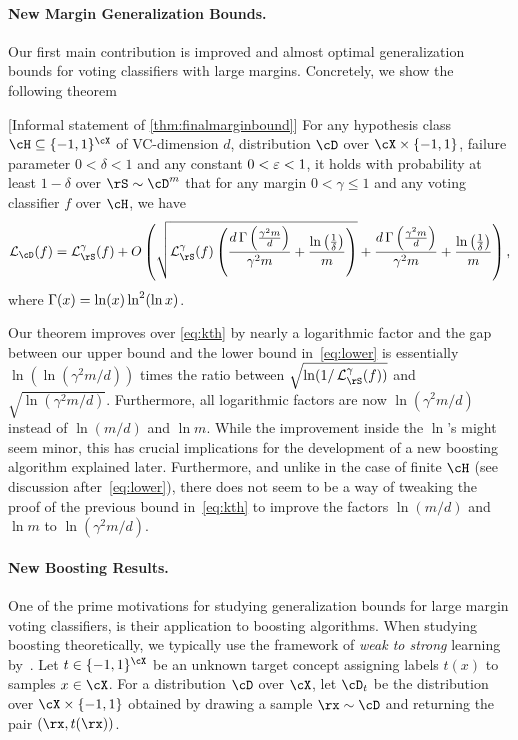 \paragraph{New Margin Generalization Bounds.}
Our first main contribution is improved and almost optimal generalization bounds for
voting classifiers with large margins. Concretely, we show the
following theorem
\begin{theorem}
\label{thm:mainintro}[Informal statement of \cref{thm:finalmarginbound}]
For any hypothesis class $ \cH \subseteq \{  -1,1\}^{\cX}$ of VC-dimension
$ d $, distribution $ \cD $ over $ \cX\times \{  -1,1\}  $, failure
parameter $0<\delta<1$ and any constant $ 0<\varepsilon<1 $, it holds with
probability at least $ 1-\delta $ over $ \rS\sim \cD^{m} $ that for
any margin $ 0<\gamma\leq 1 $ and any voting classifier $f$ over
$\cH$, we have
    \begin{align*}
     \ls_{\cD}(f)=  
     \ls_{\rS}^{\gamma}(f)
     +O\left(\sqrt{ \ls_{\rS}^{\gamma}(f) \left(\frac{d\func{\left(\frac{\gamma^{2}m }{d} \right)}}{\gamma^{2}m}
     +\frac{\ln{\left(\frac{1}{\delta} \right)}}{m}\right)}  + \frac{d\func{\left(\frac{\gamma^{2}m }{d} \right)}}{\gamma^{2}m}+\frac{\ln{\left(\frac{1}{\delta} \right)}}{m}\right),
    \end{align*}
where $\operatorname{\Gamma}(x) = \ln(x) \ln^2(\ln  x)$.
  \end{theorem}
Our theorem improves over \cref{eq:kth} by nearly a logarithmic
factor and the gap between our upper bound and the lower bound
in~\cref{eq:lower} is essentially $\ln(\ln(\gamma^2 m/d))$
times the ratio between $\sqrt{\ln(1/\ls^\gamma_\rS(f))}$ and
$\sqrt{\ln(\gamma^2 m/d)}$. Furthermore, all logarithmic factors are now $\ln(\gamma^2
m/d)$ instead of $\ln(m/d)$ and $\ln m$. While the improvement inside
the $\ln$'s might seem 
minor, this has crucial implications for the development
of a new boosting algorithm explained later. Furthermore, and unlike in the
case of finite $\cH$ (see discussion after~\cref{eq:lower}), there does not seem to be a way of tweaking the
proof of the previous bound in~\cref{eq:kth} to improve the factors $\ln(m/d)$ and $\ln m$
to $\ln(\gamma^2 m/d)$. 

\paragraph{New Boosting Results.}
One of the prime motivations for studying generalization bounds for large margin voting
classifiers, is their application to boosting algorithms. When
studying boosting theoretically, we typically use the framework of
\emph{weak to strong} learning
by~\cite{kearns1988learning,kearns1994learning}. Let $t \in
\{-1,1\}^\cX$ be an unknown target concept assigning labels $t(x)$ to
samples $x \in \cX$. For a distribution $\cD$ over $\cX$, let $\cD_t$
be the distribution over $\cX \times \{-1,1\}$ obtained by drawing a
sample $\rx \sim \cD$ and returning the pair $(\rx, t(\rx))$.


